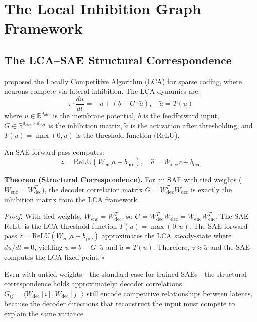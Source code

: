 \documentclass{article}
\begin{document}
\section{The Local Inhibition Graph Framework}
\label{sec:framework}

\subsection{The LCA--SAE Structural Correspondence}
\label{sec:correspondence}

\citet{rozell2008sparse} proposed the Locally Competitive Algorithm (LCA) for sparse coding, where neurons compete via lateral inhibition. The LCA dynamics are:
\begin{equation}
\tau \cdot \frac{du}{dt} = -u + (b - G \cdot \tilde{a}), \quad \tilde{a} = T(u)
\end{equation}
where $u \in \mathbb{R}^{d_{\text{dict}}}$ is the membrane potential, $b$ is the feedforward input, $G \in \mathbb{R}^{d_{\text{dict}} \times d_{\text{dict}}}$ is the inhibition matrix, $\tilde{a}$ is the activation after thresholding, and $T(u) = \max(0, u)$ is the threshold function (ReLU).

An SAE forward pass computes:
\begin{equation}
z = \text{ReLU}(W_{\text{enc}} a + b_{\text{pre}}), \quad \hat{a} = W_{\text{dec}} z + b_{\text{dec}}
\end{equation}

\textbf{Theorem (Structural Correspondence).} For an SAE with tied weights ($W_{\text{enc}} = W_{\text{dec}}^T$), the decoder correlation matrix $G = W_{\text{dec}}^T W_{\text{dec}}$ is exactly the inhibition matrix from the LCA framework.

\textit{Proof.} With tied weights, $W_{\text{enc}} = W_{\text{dec}}^T$, so $G = W_{\text{dec}}^T W_{\text{dec}} = W_{\text{enc}} W_{\text{enc}}^T$. The SAE ReLU is the LCA threshold function $T(u) = \max(0, u)$. The SAE forward pass $z = \text{ReLU}(W_{\text{enc}} a + b_{\text{pre}})$ approximates the LCA steady-state where $du/dt = 0$, yielding $u = b - G \cdot \tilde{a}$ and $\tilde{a} = T(u)$. Therefore, $z \approx \tilde{a}$ and the SAE computes the LCA fixed point. $\square$

Even with untied weights---the standard case for trained SAEs---the structural correspondence holds approximately: decoder correlations $G_{ij} = \langle W_{\text{dec}}[i], W_{\text{dec}}[j] \rangle$ still encode competitive relationships between latents, because the decoder directions that reconstruct the input must compete to explain the same variance.
\end{document}
